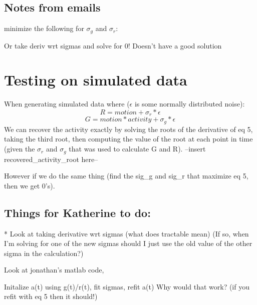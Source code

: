 \subsection{Notes from emails}
minimize the following for $\sigma_g$ and $\sigma_r$:

Or take deriv wrt sigmas and solve for 0!
Doesn't have a good solution

\section{Testing on simulated data}
When generating simulated data where ($\epsilon$ is some normally distributed noise):
\[R = motion + \sigma_r*\epsilon\]
\[G = motion * activity + \sigma_g*\epsilon\]
We can recover the activity exactly by solving the roots of the derivative of eq 5, taking the third root, then computing the value of the root at each point in time (given the $\sigma_r$ and $\sigma_g$ that was used to calculate G and R). 
--insert recovered_activity_root here--

However if we do the same thing (find the sig_g and sig_r that maximize eq 5, then we get 0's). 

\subsection{Things for Katherine to do:}
* Look at taking derivative wrt sigmas (what does tractable mean) (If so, when I'm solving for one of the new sigmas should I just use the old value of the other sigma in the calculation?)

Look at jonathan's matlab code, 

Initalize a(t) using g(t)/r(t), fit sigmas, refit a(t)
Why would that work? (if you refit with eq 5 then it should!)
   
